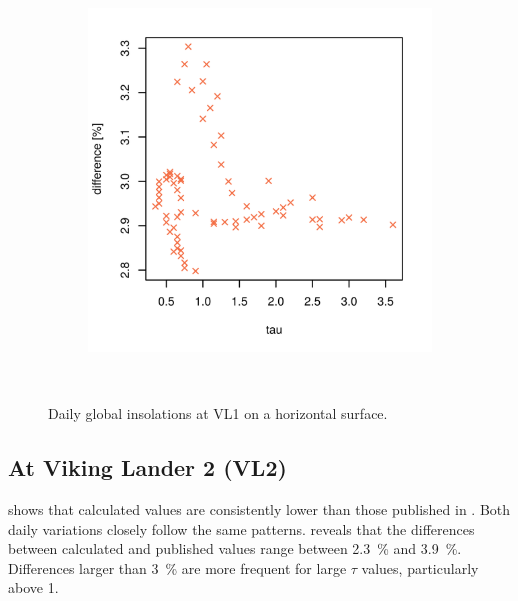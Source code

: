 \begin{figure}[h]
\begin{subfigure}[t]{\subfigureWidth}
            \includegraphics[height=\graphicsHeight]{sections/appendix/insolation-calculation-verification/plots/hh-diff-bet-exp-calc-at-vl1.png}
            \label{fig:sub:comparative-global-insolation-at-vl1-horizontal-percentage-differences}
    \end{subfigure}\\[0.8ex]
    \caption[Daily global insolations at Viking Lander 1 on a horizontal surface]
    {Daily global insolations at \ac{VL1} on a horizontal surface.}
    \label{fig:plot:comparative-global-insolation-at-vl1-horizontal}
\vspace{-2ex}
\end{figure}

\subsection{At Viking Lander 2 (VL2)}
 shows that calculated values are consistently lower than those published in . Both daily variations closely follow the same patterns.  reveals that the differences between calculated and published values range between \SI{2.3}{\percent} and \SI{3.9}{\percent}. Differences larger than \SI{3}{\percent} are more frequent for large $\tau$ values, particularly above 1.

